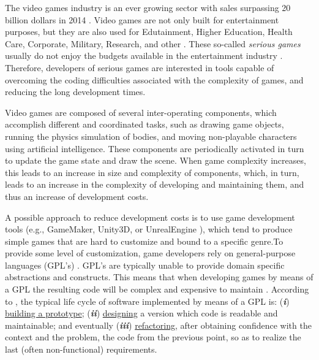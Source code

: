 The video games industry is an ever growing sector with sales surpassing 20 billion dollars in 2014 \cite{game_sales_esa}. Video games are not only built for entertainment purposes, but they are also used for Edutainment, Higher Education, Health Care, Corporate, Military, Research, and other \cite{CMP_Media_2004,serious_games}. These so-called \textit{serious games} usually do not enjoy the budgets available in the entertainment industry \cite{stapleton2004serious}. Therefore, developers of serious games are interested in tools capable of overcoming the coding difficulties associated with the complexity of games, and reducing the long development times.

Video games are composed of several inter-operating components, which accomplish different and coordinated tasks, such as drawing game objects, running the physics simulation of bodies, and moving non-playable characters using artificial intelligence. These components are periodically activated in turn to update the game state and draw the scene. When game complexity increases, this leads to an increase in size and complexity of components, which, in turn, leads to an increase in the complexity of developing and maintaining them, and thus an increase of development costs.


A possible approach to reduce development costs is to use game development tools (e.g., GameMaker, Unity3D, or UnrealEngine \cite{petridis2010engine}), which tend to produce simple games that are hard to customize and bound to a specific genre.To provide some level of customization, game developers rely on general-purpose languages (GPL's) \cite{lewis2002game}. GPL's are typically unable to provide domain specific abstractions and constructs. This means that when developing games by means of a GPL the resulting code will be complex and expensive to maintain \cite{Rocki:2014:FAP:2554850.2555029,sujeeth2014delite}. According to \cite{beck2000extreme}, the typical life cycle of software implemented by means of a GPL is: (\textit{\textbf{i}}) \underline{building a prototype}; (\textit{\textbf{ii}}) \underline{designing} a version which code is readable and maintainable; and eventually (\textit{\textbf{iii}}) \underline{refactoring}, after obtaining confidence with the context and the problem, the code from the previous point, so as to realize the last (often non-functional) requirements. 

